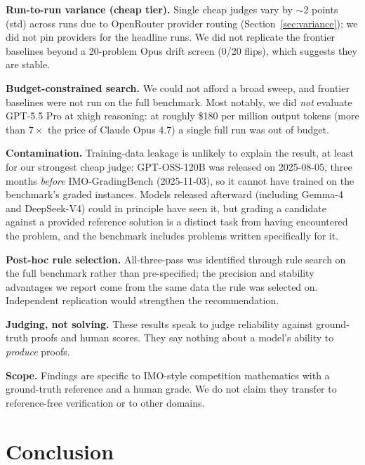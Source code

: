 \documentclass{article}
\begin{document}
\textbf{Run-to-run variance (cheap tier).} Single cheap judges vary by ${\sim}2$
points (std) across runs due to OpenRouter provider routing
(Section~\ref{sec:variance}); we did not pin providers for the headline runs. We
did not replicate the frontier baselines beyond a 20-problem Opus drift screen
(0/20 flips), which suggests they are stable.

\textbf{Budget-constrained search.} We could not afford a broad sweep, and frontier
baselines were not run on the full benchmark. Most notably, we did \emph{not}
evaluate GPT-5.5 Pro at xhigh reasoning: at roughly \$180 per million output tokens
(more than $7\times$ the price of Claude Opus 4.7) a single full run was out of
budget.

\textbf{Contamination.} Training-data leakage is unlikely to explain the result, at
least for our strongest cheap judge: GPT-OSS-120B was released on 2025-08-05, three
months \emph{before} IMO-GradingBench (2025-11-03), so it cannot have trained on the
benchmark's graded instances. Models released afterward (including Gemma-4 and
DeepSeek-V4) could in principle have seen it, but grading a candidate against a
provided reference solution is a distinct task from having encountered the problem,
and the benchmark includes problems written specifically for it.

\textbf{Post-hoc rule selection.} All-three-pass was identified through rule search
on the full benchmark rather than pre-specified; the precision and stability
advantages we report come from the same data the rule was selected on. Independent
replication would strengthen the recommendation.

\textbf{Judging, not solving.} These results speak to judge reliability against
ground-truth proofs and human scores. They say nothing about a model's ability to
\emph{produce} proofs.

\textbf{Scope.} Findings are specific to IMO-style competition mathematics with a
ground-truth reference and a human grade. We do not claim they transfer to
reference-free verification or to other domains.

\section{Conclusion}
\label{sec:conclusion}
\end{document}
